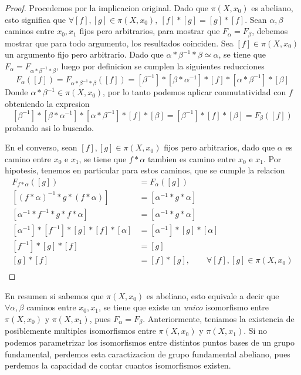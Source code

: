 \begin{proof}
  Procedemos por la implicacion original. Dado que \(\pi (X, x_0)\) es
  abeliano, esto significa que \(\forall [f],[g] \in \pi (X, x_0),\ [f]
  * [g] = [g] * [f]\). Sean \(\alpha, \beta\) caminos entre \(x_0,x_1\)
  fijos pero arbitrarios, para mostrar que \(F_\alpha = F_\beta\),
  debemos mostrar que para todo argumento, los resultados coinciden. Sea
  \([f] \in \pi (X, x_0) \) un argumento fijo pero arbitrario. Dado que
  \(\alpha * \beta^{-1} * \beta \simeq \alpha \), se tiene que
  \(F_\alpha = F _{\alpha * \beta^{-1} * \beta}\), luego por definicion
  se cumplen la siguientes reducciones
  \[ F_\alpha ([f]) = F_{\alpha * \beta^{-1} * \beta} ([f]) =
    [\beta^{-1}] * [\beta * \alpha^{-1}] * [f] * [\alpha * \beta^{-1}]
    * [\beta] \]
  Donde \(\alpha * \beta^{-1} \in \pi (X, x_0) \), por lo tanto podemos
  aplicar conmutatividad con \(f\) obteniendo la expresion
  \[ [\beta^{-1}] * [\beta * \alpha^{-1}] * [\alpha * \beta^{-1}] * [f]
    * [\beta] = [\beta^{-1}] * [f] * [\beta] = F_\beta ([f]) \]
  probando asi lo buscado.

  En el converso, sean \([f],[g] \in \pi (X, x_0) \) fijos pero
  arbitrarios, dado que \(\alpha\) es camino entre \(x_0\) e \(x_1\), se
  tiene que \(f * \alpha\) tambien es camino entre \(x_0\) e \(x_1\).
Por hipotesis, tenemos en particular para estos caminos, que se cumple
la relacion
  \begin{align*}
    F_{f * \alpha} ([g]) &= F_{\alpha} ([g]) \\
    [(f * \alpha)^{-1} * g * (f * \alpha) ] &= [\alpha^{-1} * g * \alpha] \\
    [\alpha^{-1} * f^{-1} * g * f * \alpha ] &= [\alpha^{-1} * g * \alpha] \\
    [\alpha^{-1}] * [f^{-1}] * [g] * [f] * [\alpha] &= [\alpha^{-1}] *
        [g] * [\alpha] \\
    [f^{-1}] * [g] * [f] &= [g] \\
    [g] * [f] &= [f] * [g], \qquad \forall [f],[g] \in \pi (X, x_0) \\
  \end{align*}
\end{proof}
En resumen si sabemos que \(\pi (X, x_0)\) es abeliano, esto equivale a
decir que \(\forall \alpha,\beta\) caminos entre \(x_0, x_1\), se tiene
que existe un \emph{unico} isomorfismo entre \(\pi (X,x_0) \) y \( \pi
(X,x_1)\), pues \(F_\alpha = F_\beta\). Anteriormente, teniamos la
existencia de posiblemente multiples isomorfismos entre \(\pi (X, x_0)
\) y \(\pi (X, x_1) \). Si no podemos parametrizar los isomorfismos
entre distintos puntos bases de un grupo fundamental, perdemos esta
caractizacion de grupo fundamental abeliano, pues perdemos la capacidad
de contar cuantos isomorfismos existen.

